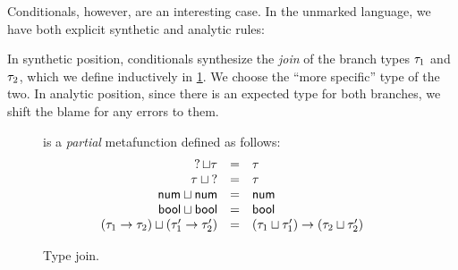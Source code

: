 Conditionals, however, are an interesting case. In the unmarked language, we have both explicit
synthetic and analytic rules:
%
\begin{mathpar}

\end{mathpar}
%
In synthetic position, conditionals synthesize the \emph{join} of the branch types $\TMV_1$ and
$\TMV_2$, which we define inductively in \cref{fig:calculus-type-join}. We choose the ``more
specific'' type of the two. In analytic position, since
there is an expected type for both branches, we shift the blame for any errors to them.

\newcommand{\joinsTo}[3]{\ensuremath{\TJoin{#1}{#2} & = & #3}}
\begin{figure}[htbp]
  \raggedright
   is a \emph{partial} metafunction defined as follows:
  \[\begin{array}{rcl}
    \joinsTo{\TUnknown}{\TMV}{\TMV} \\
    \joinsTo{\TMV}{\TUnknown}{\TMV} \\
    \joinsTo{\TNum}{\TNum}{\TNum} \\
    \joinsTo{\TBool}{\TBool}{\TBool} \\
    \joinsTo{(\TArrow{\TMV_1}{\TMV_2})}{(\TArrow{\TMV_1'}{\TMV_2'})}{\TArrow{(\TJoin{\TMV_1}{\TMV_1'})}{(\TJoin{\TMV_2}{\TMV_2'})}}
  \end{array}\]
  \vspace{-10px}
  \caption{Type join.}
  \label{fig:calculus-type-join}
\end{figure}

